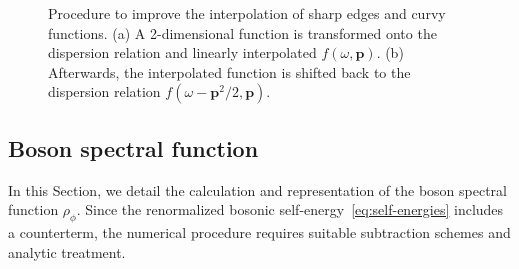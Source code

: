 \begin{figure}[h]
	\centering
	\caption[Improving sampling and interpolation of 2d functions with sharp edges]{Procedure to improve the interpolation of sharp edges and curvy functions. (a) A 2-dimensional function is transformed onto the dispersion relation and linearly interpolated $f(\omega,\bm{p})$. (b) Afterwards, the interpolated function is shifted back to the dispersion relation $f(\omega-\bm{p}^2/2,\bm{p})$.}
	\label{fig:shift_dispersion}
\end{figure}


\subsection*{Boson spectral function}
\label{subsec:boson_spec}

In this Section, we detail the calculation and representation of the boson spectral function $\rho_{\phi}$. Since the renormalized bosonic self-energy~\eqref{eq:self-energies} includes a counterterm, the numerical procedure requires suitable subtraction schemes and analytic treatment. 


